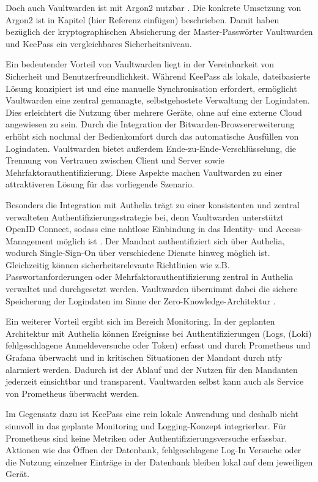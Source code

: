 Doch auch Vaultwarden ist mit Argon2 nutzbar \cite{cloudron}. Die konkrete Umsetzung von Argon2 ist in Kapitel (hier Referenz einfügen) beschrieben. Damit haben bezüglich der kryptographischen Absicherung der Master-Passwörter Vaultwarden und KeePass ein vergleichbares Sicherheitsniveau. 

Ein bedeutender Vorteil von Vaultwarden liegt in der Vereinbarkeit von Sicherheit und Benutzerfreundlichkeit. Während KeePass als lokale, dateibasierte Lösung konzipiert ist und eine manuelle Synchronisation erfordert, ermöglicht Vaultwarden eine zentral gemanagte, selbstgehostete Verwaltung der Logindaten. Dies erleichtert die Nutzung über mehrere Geräte, ohne auf eine externe Cloud angewiesen zu sein. Durch die Integration der Bitwarden-Browsererweiterung erhöht sich nochmal der Bedienkomfort durch das automatische Ausfüllen von Logindaten. Vaultwarden bietet außerdem Ende-zu-Ende-Verschlüsselung, die Trennung von Vertrauen zwischen Client und Server sowie Mehrfaktorauthentifizierung. Diese Aspekte machen Vaultwarden zu einer attraktiveren Lösung für das vorliegende Szenario. \cite{vaultwarden_git} 

Besonders die Integration mit Authelia trägt zu einer konsistenten und zentral verwalteten Authentifizierungsstrategie bei, denn Vaultwarden unterstützt OpenID Connect, sodass eine nahtlose Einbindung in das Identity- und Access-Management möglich ist \cite{v1350}. Der Mandant authentifiziert sich über Authelia, wodurch Single-Sign-On über verschiedene Dienste hinweg möglich ist. Gleichzeitig können sicherheitsrelevante Richtlinien wie z.B. Passwortanforderungen oder Mehrfaktorauthentifizierung zentral in Authelia verwaltet und durchgesetzt werden. Vaultwarden übernimmt dabei die sichere Speicherung der Logindaten im Sinne der Zero-Knowledge-Architektur \cite{hussain_2026}. 

Ein weiterer Vorteil ergibt sich im Bereich Monitoring. In der geplanten Architektur mit Authelia können Ereignisse bei Authentifizierungen (Logs, (Loki) fehlgeschlagene Anmeldeversuche oder Token) erfasst und durch Prometheus und Grafana überwacht und in kritischen Situationen der Mandant durch ntfy alarmiert werden. Dadurch ist der Ablauf und der Nutzen für den Mandanten jederzeit einsichtbar und transparent. Vaultwarden selbst kann auch als Service von Prometheus überwacht werden.

Im Gegensatz dazu ist KeePass eine rein lokale Anwendung und deshalb nicht sinnvoll in das geplante Monitoring und Logging-Konzept integrierbar. Für Prometheus sind keine Metriken oder Authentifizierungsversuche erfassbar. Aktionen wie das Öffnen der Datenbank, fehlgeschlagene Log-In Versuche oder die Nutzung einzelner Einträge in der Datenbank bleiben lokal auf dem jeweiligen Gerät. 

